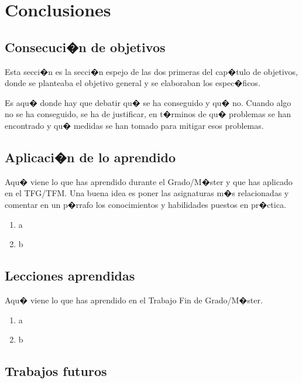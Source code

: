\documentclass[a4paper, 12pt]{book}
\begin{document}
\cleardoublepage
\chapter{Conclusiones}
\label{chap:conclusiones}


\section{Consecuci�n de objetivos}
\label{sec:consecucion-objetivos}

Esta secci�n es la secci�n espejo de las dos primeras del cap�tulo de objetivos, donde se planteaba el objetivo general y se elaboraban los espec�ficos.

Es aqu� donde hay que debatir qu� se ha conseguido y qu� no.
Cuando algo no se ha conseguido, se ha de justificar, en t�rminos de qu� problemas se han encontrado y qu� medidas se han tomado para mitigar esos problemas.


\section{Aplicaci�n de lo aprendido}
\label{sec:aplicacion}

Aqu� viene lo que has aprendido durante el Grado/M�ster y que has aplicado en el TFG/TFM. Una buena idea es poner las asignaturas m�s relacionadas y comentar en un p�rrafo los conocimientos y habilidades puestos en pr�ctica.

\begin{enumerate}
  \item a
  \item b
\end{enumerate}


\section{Lecciones aprendidas}
\label{sec:lecciones_aprendidas}

Aqu� viene lo que has aprendido en el Trabajo Fin de Grado/M�ster.

\begin{enumerate}
  \item a
  \item b
\end{enumerate}


\section{Trabajos futuros}
\label{sec:trabajos_futuros}
\end{document}
